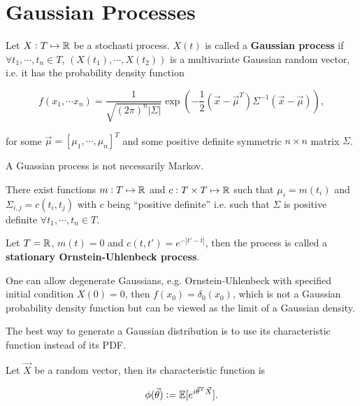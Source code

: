 \section{Gaussian Processes}

\begin{definition}
    Let $X: T \mapsto \mathbb{R}$ be a stochasti process. $X(t)$ is called a \textbf{Gaussian process} if $\forall t_1, \cdots, t_n \in T$, $(X(t_1), \cdots, X(t_2))$ is a multivariate Gaussian random vector, i.e. it has the probability density function 

    \begin{equation*}
        f(x_1, \cdots x_n) = \frac{1}{\sqrt{(2\pi)^n |\Sigma|}} \exp \left( - \frac{1}{2} (\vec{x} - \vec{\mu}^T) \Sigma^{-1} (\vec{x} - \vec{\mu}) \right),
    \end{equation*}

    for some $\vec{\mu} = [\mu_1, \cdots, \mu_n]^T$ and some positive definite symmetric $n\times n$ matrix $\Sigma$.
\end{definition}

\begin{remark}
    A Guassian process is not necessarily Markov.
\end{remark}

\begin{proposition}
    There exist functions $m: T \mapsto \mathbb{R}$ and $c:T\times T \mapsto \mathbb{R}$ such that $\mu_i = m(t_i)$ and $\Sigma_{i,j} = c(t_i, t_j)$ with $c$ being ``positive definite'' i.e. such that $\Sigma$ is positive definite $\forall t_1, \cdots, t_n \in T$.
\end{proposition}

\begin{example}
    Let $T = \mathbb{R}$, $m(t) = 0$ and $c(t, t') = e^{-|t'-t|}$, then the process is called a \textbf{stationary Ornstein-Uhlenbeck process}.
\end{example}

One can allow degenerate Gaussians, e.g. Ornstein-Uhlenbeck with specified initial condition $X(0) = 0$, then $f(x_0) = \delta_0(x_0)$, which is not a Gaussian probability density function but can be viewed as the limit of a Gaussian density.

The best way to generate a Gaussian distribution is to use its characteristic function instead of its PDF.

\begin{definition}
    Let $\vec{X}$ be a random vector, then its characteristic function is 

    \begin{equation*}
        \phi(\vec{\theta}):=\mathbb{E}[e^{i \vec{\theta}^T\vec{X}}].
    \end{equation*}
\end{definition}

